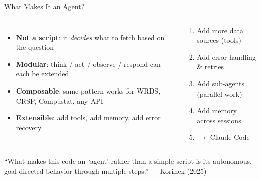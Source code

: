 \documentclass[aspectratio=169, 11pt]{beamer}
\begin{document}
\begin{frame}[shrink=5]{What Makes It an Agent?}
\begin{columns}[T]
\begin{itemize}
  \item \textbf{Not a script}: it \emph{decides} what to fetch based on the question
  \item \textbf{Modular}: think / act / observe / respond can each be extended
  \item \textbf{Composable}: same pattern works for WRDS, CRSP, Compustat, any API
  \item \textbf{Extensible}: add tools, add memory, add error recovery
\end{itemize}

\begin{keyinsight}
\begin{enumerate}
  \item Add more data sources (tools)
  \item Add error handling \& retries
  \item Add sub-agents (parallel work)
  \item Add memory across sessions
  \item $\rightarrow$ Claude Code
\end{enumerate}
\end{keyinsight}
\end{columns}
\vspace{0.3cm}
\begin{bigquote}
\small
``What makes this code an `agent' rather than a simple script is its autonomous, goal-directed behavior through multiple steps.'' --- Korinek (2025)
\end{bigquote}
\end{frame}
\end{document}

